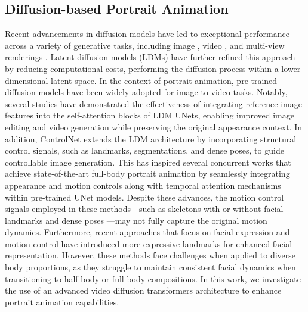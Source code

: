 \subsection{Diffusion-based Portrait Animation}

Recent advancements in diffusion models \cite{ho2020denoising,song2020denoising,song2020score} have led to exceptional performance across a variety of generative tasks, including image \cite{saharia2022photorealistic}, video \cite{guo2023animatediff,blattmann2023stable,bao2023latentwarp}, and multi-view renderings \cite{liu2023zero1to3, liu2023one2345, gu2023diffportrait3d}. Latent diffusion models (LDMs) \cite{rombach2021highresolution,fei2024dimba} have further refined this approach by reducing computational costs, performing the diffusion process within a lower-dimensional latent space. In the context of portrait animation, pre-trained diffusion models \cite{saharia2022photorealistic, rombach2021highresolution} have been widely adopted for image-to-video tasks. Notably, several studies \cite{cao2023masactrl, lin2023consistent123} have demonstrated the effectiveness of integrating reference image features into the self-attention blocks of LDM UNets, enabling improved image editing and video generation while preserving the original appearance context. 
In addition,  ControlNet \cite{zhang2023adding} extends the LDM architecture by incorporating structural control signals, such as landmarks, segmentations, and dense poses, to guide controllable image generation. This has inspired several concurrent works \cite{hu2023animateanyone, xu2023magicanimate, chang2024magicpose,qiu2024moviecharacter,fang2024motioncharacter} that achieve state-of-the-art full-body portrait animation by seamlessly integrating appearance and motion controls along with temporal attention mechanisms \cite{guo2023animatediff, guo2023sparsectrl} within pre-trained UNet models. Despite these advances, the motion control signals employed in these methods—such as skeletons with or without facial landmarks \cite{hu2023animateanyone, chang2024magicpose} and dense poses \cite{xu2023magicanimate}—may not fully capture the original motion dynamics. %
Furthermore, recent approaches \cite{ma2024follow, chen2024echomimic} that focus on facial expression and motion control have introduced more expressive landmarks for enhanced facial representation. However, these methods face challenges when applied to diverse body proportions, as they struggle to maintain consistent facial dynamics when transitioning to half-body or full-body compositions. In this work, we investigate the use of an advanced video diffusion transformers architecture to enhance portrait animation capabilities.
